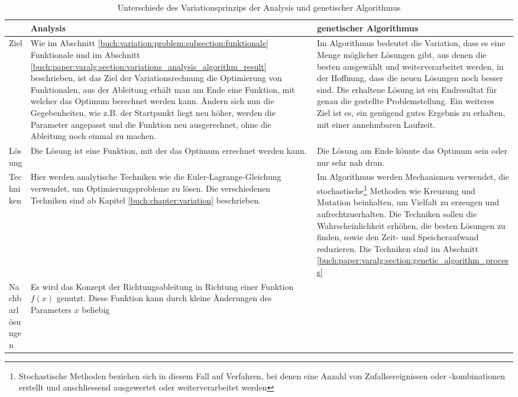 \begin{xltabular}{\textwidth}{|L|X|X|}
  \caption{Unterschiede des Variationsprinzips der Analysis und genetischer Algorithmus}
  \label{tab:variation_comparison} \\
  \hline
  & Analysis 
  & genetischer Algorithmus 
  \\ \hline
  Ziel
  & 
  Wie im Abschnitt \ref{buch:variation:problem:subsection:funktionale} Funktionale und
  im Abschnitt \ref{buch:paper:varalg:section:variations_analysis_algorithm_result}
  beschrieben, ist das Ziel der Variationsrechnung die Optimierung von Funktionalen, aus der
  Ableitung erhält man am Ende eine Funktion, mit welcher das Optimum berechnet werden kann. 
  Ändern sich nun die Gegebenheiten, wie z.B. der Startpunkt liegt neu höher, werden die Parameter 
  angepasst und die Funktion neu ausgerechnet, ohne die Ableitung noch einmal zu machen.
  & 
  Im Algorithmus bedeutet die Variation, dass es eine Menge möglicher Lösungen gibt, 
  aus denen die besten ausgewählt und weiterverarbeitet werden, in der 
  Hoffnung, dass die neuen Lösungen noch besser sind. Die erhaltene Lösung ist ein Endresultat für
  genau die gestellte Problemstellung. Ein weiteres Ziel ist es,
  ein genügend gutes Ergebnis zu erhalten, mit einer annehmbaren Laufzeit.
  \\ \hline
  Lösung
  & 
  Die Lösung ist eine Funktion, mit der das Optimum errechnet werden kann.
  & 
  Die Lösung am Ende könnte das Optimum sein oder nur sehr nah dran.
  \\ \hline
  Techniken  
  & 
  Hier werden analytische Techniken wie die Euler-Lagrange-Gleichung verwendet, 
  um Optimierungsprobleme zu lösen. Die verschiedenen Techniken sind ab Kapitel
  \ref{buch:chapter:variation} beschrieben.
  & Im Algorithmus werden Mechanismen verwendet, die stochastische\footnote{
    Stochastische Methoden beziehen sich in diesem Fall auf Verfahren, bei denen 
    eine Anzahl von Zufallsereignissen oder -kombinationen erstellt und anschliessend 
    ausgewertet oder weiterverarbeitet werden
  }
  Methoden wie Kreuzung und Mutation beinhalten, um Vielfalt zu erzeugen und aufrechtzuerhalten.
  Die Techniken sollen die Wahrscheinlichkeit erhöhen, die besten Lösungen zu finden, 
  sowie den Zeit- und Speicheraufwand reduzieren.
  Die Techniken sind im Abschnitt \ref{buch:paper:varalg:section:genetic_algorithm_process}
  \\ \hline
  Nachbarlösungen
  & 
  Es wird das Konzept der Richtungsableitung in Richtung einer Funktion \(f(x)\)
  genutzt. Diese Funktion kann durch kleine Änderungen des Parameters \(x\) beliebig

\end{xltabular}
